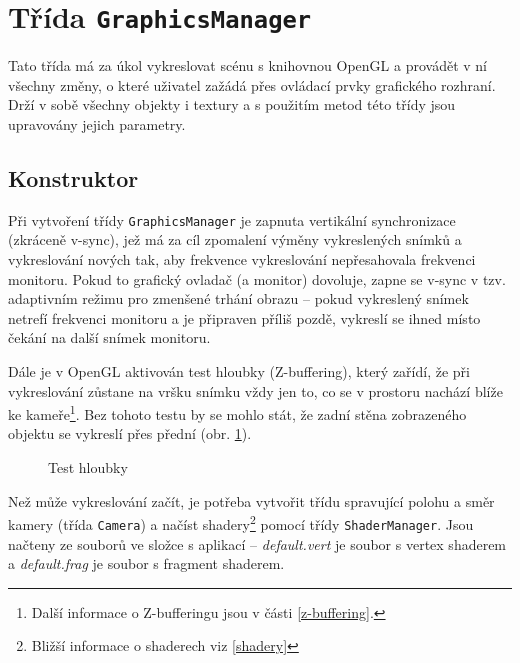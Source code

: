 \documentclass[a4paper, 11pt]{report}
\begin{document}
\section{Třída \texttt{GraphicsManager}}
Tato třída má za úkol vykreslovat scénu s knihovnou OpenGL a provádět v ní všechny změny, o které uživatel zažádá přes ovládací prvky grafického rozhraní. Drží v sobě všechny objekty i textury a s použitím metod této třídy jsou upravovány jejich parametry.

\subsection{Konstruktor}
Při vytvoření třídy \texttt{GraphicsManager} je zapnuta vertikální synchronizace (zkráceně v-sync), jež má za cíl zpomalení výměny vykreslených snímků a vykreslování nových tak, aby frekvence vykreslování nepřesahovala frekvenci monitoru. Pokud to grafický ovladač (a monitor) dovoluje, zapne se v-sync v tzv. adaptivním režimu pro zmenšené trhání obrazu -- pokud vykreslený snímek netrefí frekvenci monitoru a je připraven příliš pozdě, vykreslí se ihned místo čekání na další snímek monitoru.

\begin{minipage}{\textwidth}
Dále je v OpenGL aktivován test hloubky (Z-buffering), který zařídí, že při vykreslování zůstane na vršku snímku vždy jen to, co se v prostoru nachází blíže ke kameře\footnote{Další informace o Z-bufferingu jsou v části \ref{z-buffering}.}. Bez tohoto testu by se mohlo stát, že zadní stěna zobrazeného objektu se vykreslí přes přední (obr. \ref{depthtest}).
\end{minipage}

\begin{figure}[h]
    \centering
    \qquad
    \caption{\label{depthtest}Test hloubky}
\end{figure}

Než může vykreslování začít, je potřeba vytvořit třídu spravující polohu a směr kamery (třída \texttt{Camera}) a načíst shadery\footnote{Bližší informace o shaderech viz \ref{shadery}} pomocí třídy \texttt{ShaderManager}. Jsou načteny ze souborů ve složce s aplikací -- \emph{default.vert} je soubor s vertex shaderem a \emph{default.frag} je soubor s fragment shaderem.
\end{document}
